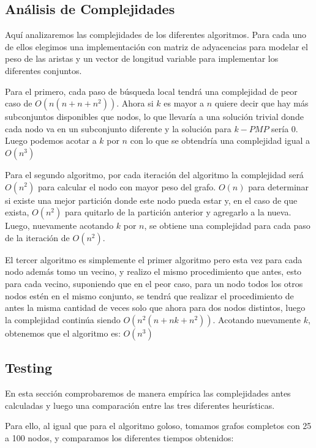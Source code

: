 \newpage

\subsection{Análisis de Complejidades}

Aquí analizaremos las complejidades de los diferentes algoritmos. Para cada uno de ellos elegimos una implementación con matriz de adyacencias para modelar el peso de las aristas y un vector de longitud variable para implementar los diferentes conjuntos.

Para el primero, cada paso de búsqueda local tendrá una complejidad de peor caso de $O(n(n + n + n^2))$. Ahora si $k$ es mayor a $n$ quiere decir que hay más subconjuntos disponibles que nodos, lo que llevaría a una solución trivial donde cada nodo va en un subconjunto diferente y la solución para $k-PMP$ sería 0.
Luego podemos acotar a $k$ por $n$ con lo que se obtendría una complejidad igual a $O(n^3)$

Para el segundo algoritmo, por cada iteración del algoritmo la complejidad será $O(n^2)$ para calcular el nodo con mayor peso del grafo. $O(n)$ para determinar si existe una mejor partición donde este nodo pueda estar y, en el caso de que exista, $O(n^2)$ para quitarlo de la partición anterior y agregarlo a la nueva. Luego, nuevamente acotando $k$ por $n$, se obtiene una complejidad para cada paso de la iteración de $O(n^2)$.

El tercer algoritmo es simplemente el primer algoritmo pero esta vez para cada nodo además tomo un vecino, y realizo el mismo procedimiento que antes, esto para cada vecino, suponiendo que en el peor caso, para un nodo todos los otros nodos estén en el mismo conjunto, se tendrá que realizar el procedimiento de antes la misma cantidad de veces solo que ahora para dos nodos distintos, luego la complejidad continúa siendo $O(n^2 (n + n k + n^2))$. Acotando nuevamente $k$, obtenemos que el algoritmo es: $O(n^3)$

\subsection{Testing}

En esta sección comprobaremos de manera empírica las complejidades antes calculadas y luego una comparación entre las tres diferentes heurísticas.

Para ello, al igual que para el algoritmo goloso, tomamos grafos completos con 25 a 100 nodos, y comparamos los diferentes tiempos obtenidos:

